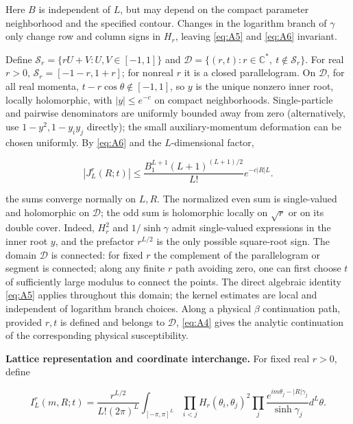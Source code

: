 \documentclass[11pt,a4paper]{article}
\numberwithin{equation}{section}
\theoremstyle{plain}
\theoremstyle{definition}
\begin{document}
Here \(B\) is independent of \(L\), but may depend on the compact parameter neighborhood and the specified contour. Changes in the logarithm branch of \(\gamma\) only change row and column signs in \(H_r\), leaving \eqref{eq:A5} and \eqref{eq:A6} invariant.

Define \(\mathcal S_r=\{r U+V:U,V\in[-1,1]\}\) and \(\mathcal D=\{(r,t):r\in\mathbb C^*,\ t\notin\mathcal S_r\}\). For real \(r>0\), \(\mathcal S_r=[-1-r,1+r]\); for nonreal \(r\) it is a closed parallelogram. On \(\mathcal D\), for all real momenta, \(t-r\cos\theta\notin[-1,1]\), so \(y\) is the unique nonzero inner root, locally holomorphic, with \(|y|\le e^{-c}\) on compact neighborhoods. Single-particle and pairwise denominators are uniformly bounded away from zero (alternatively, use \(1-y^2,1-y_i y_j\) directly); the small auxiliary-momentum deformation can be chosen uniformly. By \eqref{eq:A6} and the \(L\)-dimensional factor,

\begin{equation}
|J_L^{r}(R;t)|\le \frac{B_1^{L+1}(L+1)^{(L+1)/2}}{L!}e^{-c|R|L}.
\label{eq:A7}
\end{equation}

the sums converge normally on \(L,R\). The normalized even sum is single-valued and holomorphic on \(\mathcal D\); the odd sum is holomorphic locally on \(\sqrt r\) or on its double cover. Indeed, \(H_r^2\) and \(1/\sinh\gamma\) admit single-valued expressions in the inner root \(y\), and the prefactor \(r^{L/2}\) is the only possible square-root sign. The domain \(\mathcal D\) is connected: for fixed \(r\) the complement of the parallelogram or segment is connected; along any finite \(r\) path avoiding zero, one can first choose \(t\) of sufficiently large modulus to connect the points. The direct algebraic identity \eqref{eq:A5} applies throughout this domain; the kernel estimates are local and independent of logarithm branch choices. Along a physical \(\beta\) continuation path, provided \(r,t\) is defined and belongs to \(\mathcal D\), \eqref{eq:A4} gives the analytic continuation of the corresponding physical susceptibility.

\textbf{Lattice representation and coordinate interchange.} For fixed real \(r>0\), define

\begin{equation}
I_L^r(m,R;t)=\frac{r^{L/2}}{L!(2\pi)^L}\int_{[-\pi,\pi]^L}\prod_{i<j}H_r(\theta_i,\theta_j)^2\prod_j\frac{e^{im\theta_j-|R|\gamma_j}}{\sinh\gamma_j}d^L\theta.
\label{eq:A8}
\end{equation}
\end{document}
